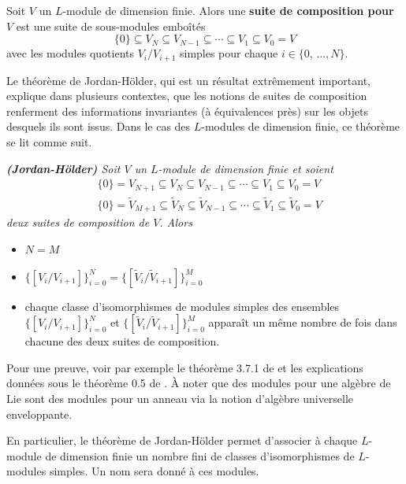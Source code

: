 \begin{Def} Soit $V$ un $L$-module de dimension finie. Alors une \textbf{suite de composition pour $V$} est une suite de sous-modules emboîtés 
$$ \{0\} \subseteq V_N \subseteq V_{N-1} \subseteq \cdots \subseteq V_1 \subseteq V_0 = V $$
avec les modules quotients $V_i/V_{i+1}$ simples pour chaque $i \in \{0,\,...,N\}$. 
\end{Def}

Le théorème de Jordan-Hölder, qui est un résultat extrêmement important, explique dans plusieurs contextes, que les notions de suites de composition renferment des informations invariantes (à équivalences près) sur les objets desquels ils sont issus. Dans le cas des $L$-modules de dimension finie, ce théorème se lit comme suit.

\begin{Thm} \em \textbf{(Jordan-Hölder)} \label{jordanholder} \em Soit $V$ un $L$-module de dimension finie et soient 
\begin{align*}
&\{0\} = V_{N+1} \subseteq V_N \subseteq V_{N-1} \subseteq \cdots \subseteq V_1 \subseteq V_0 = V\\
&\{0\} = \tilde{V}_{M+1} \subseteq \tilde{V}_N \subseteq \tilde{V}_{N-1} \subseteq \cdots \subseteq \tilde{V}_1 \subseteq \tilde{V}_0 = V
\end{align*}
deux suites de composition de $V$. Alors 

\begin{itemize}
\item[\textbullet] $N = M$
\item[\textbullet] $\big\{[V_i/V_{i+1}]\big\}_{i=0}^N = \big\{[\tilde{V}_i/\tilde{V}_{i+1}]\big\}_{i=0}^M$
\item[\textbullet] chaque classe d'isomorphismes de modules simples des ensembles $\big\{[V_i/V_{i+1}]\big\}_{i=0}^N$ et \linebreak $\big\{[\tilde{V}_i/\tilde{V}_{i+1}]\big\}_{i=0}^M$ apparaît un même nombre de fois dans chacune des deux suites de composition.
\end{itemize}
\end{Thm}

Pour une preuve, voir par exemple le théorème 3.7.1 de \cite{Etingof} et les explications données sous le théorème 0.5 de \cite{FDnoncom}. À noter que des modules pour une algèbre de Lie sont des modules pour un anneau via la notion d'algèbre universelle enveloppante.

\begin{Rem} En particulier, le théorème de Jordan-Hölder permet d'associer à chaque $L$-module de dimension finie un nombre fini de classes d'isomorphismes de $L$-modules simples. Un nom sera donné à ces modules.
\end{Rem}

